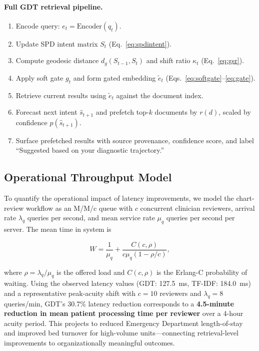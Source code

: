 \documentclass[11pt]{article}
\begin{document}
\paragraph{Full GDT retrieval pipeline.}
\begin{enumerate}
  \item Encode query: $e_t = \mathrm{Encoder}(q_t)$.
  \item Update SPD intent matrix $S_t$ (Eq.~\ref{eq:spdintent}).
  \item Compute geodesic distance $d_g(S_{t-1},S_t)$ and shift ratio $\kappa_t$ (Eq.~\ref{eq:gsr}).
  \item Apply soft gate $g_t$ and form gated embedding $\tilde{e}_t$ (Eqs.~\ref{eq:softgate}--\ref{eq:gate}).
  \item Retrieve current results using $\tilde{e}_t$ against the document index.
  \item Forecast next intent $\hat{s}_{t+1}$ and prefetch top-$k$ documents by $r(d)$, scaled by confidence $p(\hat{s}_{t+1})$.
  \item Surface prefetched results with source provenance, confidence score, and label ``Suggested based on your diagnostic trajectory.''
\end{enumerate}

\subsection{Operational Throughput Model}
\label{sec:queueing}

To quantify the operational impact of latency improvements, we model the chart-review workflow as an M/M/c queue \citep{kleinrock1975,gross2008} with $c$ concurrent clinician reviewers, arrival rate $\lambda_q$ queries per second, and mean service rate $\mu_q$ queries per second per server. The mean time in system is

\begin{equation}
  W = \frac{1}{\mu_q} + \frac{C(c,\rho)}{c\mu_q(1-\rho/c)},
  \label{eq:waiting_time}
\end{equation}

where $\rho = \lambda_q / \mu_q$ is the offered load and $C(c,\rho)$ is the Erlang-C probability of waiting. Using the observed latency values (GDT: 127.5~ms, TF-IDF: 184.0~ms) and a representative peak-acuity shift with $c=10$ reviewers and $\lambda_q = 8$ queries/min, GDT's 30.7\% latency reduction corresponds to a \textbf{4.5-minute reduction in mean patient processing time per reviewer} over a 4-hour acuity period. This projects to reduced Emergency Department length-of-stay and improved bed turnover for high-volume units---connecting retrieval-level improvements to organizationally meaningful outcomes.
\end{document}
